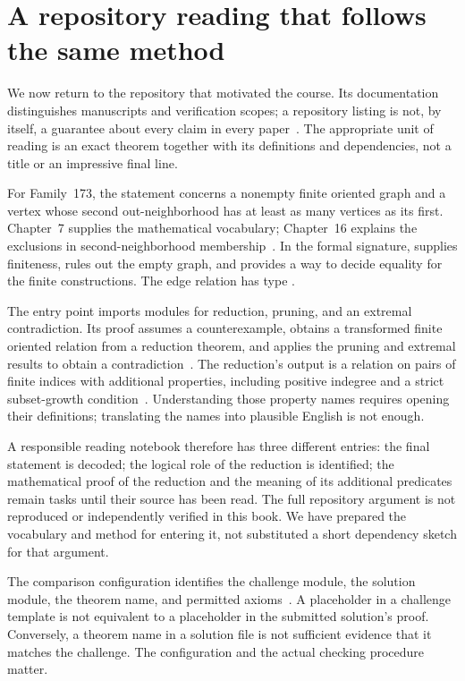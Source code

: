\section{A repository reading that follows the same method}
We now return to the repository that motivated the course. Its documentation distinguishes manuscripts and verification scopes; a repository listing is not, by itself, a guarantee about every claim in every paper~\cite{oairepo}. The appropriate unit of reading is an exact theorem together with its definitions and dependencies, not a title or an impressive final line.

For Family~173, the statement concerns a nonempty finite oriented graph and a vertex whose second out-neighborhood has at least as many vertices as its first. Chapter~7 supplies the mathematical vocabulary; Chapter~16 explains the exclusions in second-neighborhood membership~\cite{oai173}. In the formal signature,  supplies finiteness,  rules out the empty graph, and  provides a way to decide equality for the finite constructions. The edge relation has type .

The entry point imports modules for reduction, pruning, and an extremal contradiction. Its proof assumes a counterexample, obtains a transformed finite oriented relation from a reduction theorem, and applies the pruning and extremal results to obtain a contradiction~\cite{oaimain}. The reduction's output is a relation on pairs of finite indices with additional properties, including positive indegree and a strict subset-growth condition~\cite{oaireduction}. Understanding those property names requires opening their definitions; translating the names into plausible English is not enough.

A responsible reading notebook therefore has three different entries: the final statement is decoded; the logical role of the reduction is identified; the mathematical proof of the reduction and the meaning of its additional predicates remain tasks until their source has been read. The full repository argument is not reproduced or independently verified in this book. We have prepared the vocabulary and method for entering it, not substituted a short dependency sketch for that argument.

The comparison configuration identifies the challenge module, the solution module, the theorem name, and permitted axioms~\cite{oaiconfig}. A placeholder in a challenge template is not equivalent to a placeholder in the submitted solution's proof. Conversely, a theorem name in a solution file is not sufficient evidence that it matches the challenge. The configuration and the actual checking procedure matter.

